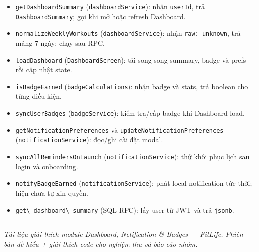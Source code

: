\documentclass[12pt,a4paper]{article}
\providecommand{\passthrough}[1]{#1}
\providecommand{\tightlist}{%
  \setlength{\itemsep}{0pt}\setlength{\parskip}{0pt}}
\begin{document}
\begin{itemize}
\tightlist
\item
  \passthrough{\lstinline!getDashboardSummary!}
  (\passthrough{\lstinline!dashboardService!}): nhận
  \passthrough{\lstinline!userId!}, trả
  \passthrough{\lstinline!DashboardSummary!}; gọi khi mở hoặc refresh
  Dashboard.
\item
  \passthrough{\lstinline!normalizeWeeklyWorkouts!}
  (\passthrough{\lstinline!dashboardService!}): nhận
  \passthrough{\lstinline!raw: unknown!}, trả mảng 7 ngày; chạy sau RPC.
\item
  \passthrough{\lstinline!loadDashboard!}
  (\passthrough{\lstinline!DashboardScreen!}): tải song song summary,
  badge và prefs rồi cập nhật state.
\item
  \passthrough{\lstinline!isBadgeEarned!}
  (\passthrough{\lstinline!badgeCalculations!}): nhận badge và stats,
  trả boolean cho từng điều kiện.
\item
  \passthrough{\lstinline!syncUserBadges!}
  (\passthrough{\lstinline!badgeService!}): kiểm tra/cấp badge khi
  Dashboard load.
\item
  \passthrough{\lstinline!getNotificationPreferences!} và
  \passthrough{\lstinline!updateNotificationPreferences!}
  (\passthrough{\lstinline!notificationService!}): đọc/ghi cài đặt
  modal.
\item
  \passthrough{\lstinline!syncAllRemindersOnLaunch!}
  (\passthrough{\lstinline!notificationService!}): thử khôi phục lịch
  sau login và onboarding.
\item
  \passthrough{\lstinline!notifyBadgeEarned!}
  (\passthrough{\lstinline!notificationService!}): phát local
  notification tức thời; hiện chưa tự xin quyền.
\item
  \passthrough{\lstinline!get\_dashboard\_summary!} (SQL RPC): lấy user
  từ JWT và trả \passthrough{\lstinline!jsonb!}.
\end{itemize}

\begin{center}\rule{0.5\linewidth}{0.5pt}\end{center}

\emph{Tài liệu giải thích module Dashboard, Notification \& Badges ---
FitLife. Phiên bản dễ hiểu + giải thích code cho nghiệm thu và báo cáo
nhóm.}
\end{document}
